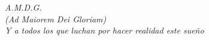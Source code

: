 \vspace*{\fill}
\begin{flushright}
	\emph{\textrm{A.M.D.G.}}\\
	\emph{\textrm{(Ad Maiorem Dei Gloriam)}} \\

	\emph{\textrm{Y a todos los que luchan por hacer realidad este sueño}}
\end{flushright}
\vspace*{\fill}
